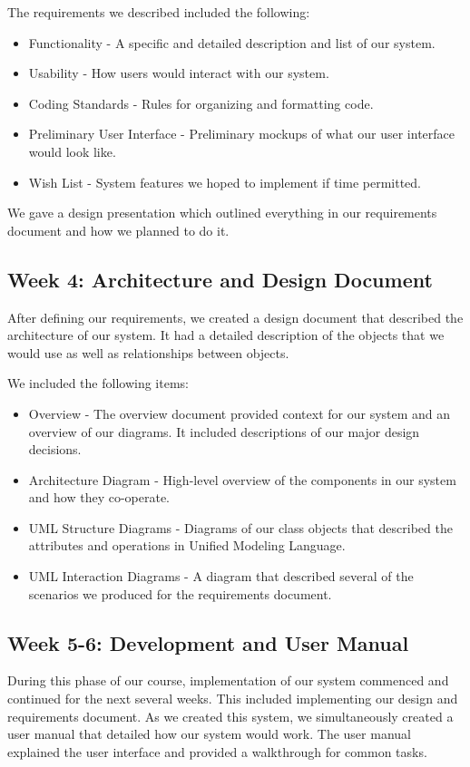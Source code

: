 \documentclass[12pt]{article}
\begin{document}
The requirements we described included the following:
\begin{itemize}
\item Functionality - A specific and detailed description and list of our system.
\item Usability - How users would interact with our system.
\item Coding Standards - Rules for organizing and formatting code.
\item Preliminary User Interface - Preliminary mockups of what our user interface would look like. 
\item Wish List - System features we hoped to implement if time permitted.
\end{itemize}

We gave a design presentation which outlined everything in our requirements document and how we planned to do it. 

\subsection*{Week 4: Architecture and Design Document}

After defining our requirements, we created a design document that described the architecture of our system. It had a detailed description of the objects that we would use as well as relationships between objects. 

We included the following items: 
\begin{itemize}
\item Overview - The overview document provided context for our system and an overview of our diagrams. It included descriptions of our major design decisions. 
\item Architecture Diagram - High-level overview of the components in our system and how they co-operate. 
\item UML Structure Diagrams - Diagrams of our class objects that described the attributes and operations in Unified Modeling Language.
\item UML Interaction Diagrams - A diagram that described several of the scenarios we produced for the requirements document. 
\end{itemize}

\subsection*{Week 5-6: Development and User Manual}
During this phase of our course, implementation of our system commenced and continued for the next several weeks. This included implementing our design and requirements document. As we created this system, we simultaneously created a user manual that detailed how our system would work. The user manual explained the user interface  and provided a walkthrough for common tasks.
\end{document}
